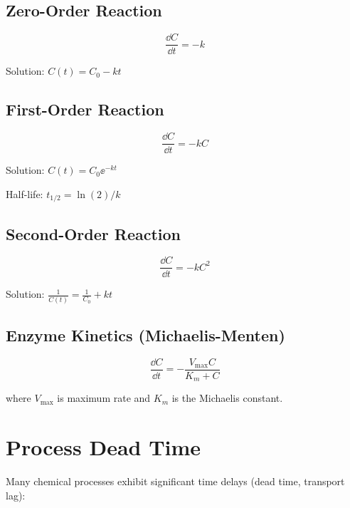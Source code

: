 \subsection{Zero-Order Reaction}

\begin{equation}
\frac{\dd C}{\dd t} = -k
\end{equation}

Solution: $C(t) = C_0 - kt$

\subsection{First-Order Reaction}

\begin{equation}
\frac{\dd C}{\dd t} = -kC
\end{equation}

Solution: $C(t) = C_0\ee^{-kt}$

Half-life: $t_{1/2} = \ln(2)/k$

\subsection{Second-Order Reaction}

\begin{equation}
\frac{\dd C}{\dd t} = -kC^2
\end{equation}

Solution: $\frac{1}{C(t)} = \frac{1}{C_0} + kt$

\subsection{Enzyme Kinetics (Michaelis-Menten)}

\begin{equation}
\frac{\dd C}{\dd t} = -\frac{V_{\max}C}{K_m + C}
\end{equation}

where $V_{\max}$ is maximum rate and $K_m$ is the Michaelis constant.

\section{Process Dead Time}
\label{sec:dead_time}

Many chemical processes exhibit significant time delays (dead time, transport lag):

